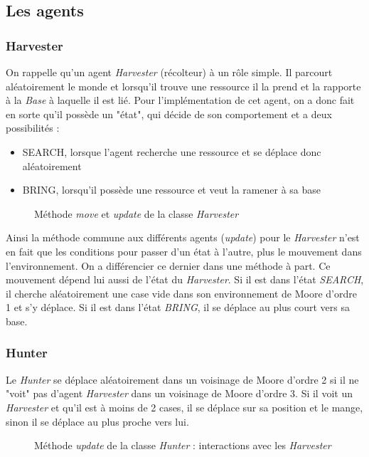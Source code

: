 \documentclass[a4paper, 12pt]{article}
\begin{document}
\subsection{Les agents}
\subsubsection{Harvester}
On rappelle qu'un agent \emph{Harvester} (récolteur) à un rôle simple. Il parcourt aléatoirement le monde et lorsqu'il trouve une ressource
il la prend et la rapporte à la \emph{Base} à laquelle il est lié. Pour l'implémentation de cet agent, on a donc fait
en sorte qu'il possède un "état", qui décide de son comportement et a deux possibilités :
\begin{itemize}
  \item SEARCH, lorsque l'agent recherche une ressource et se déplace donc aléatoirement
  \item BRING, lorsqu'il possède une ressource et veut la ramener à sa base
\end{itemize}
\begin{figure}[!h]
  \centering
  \caption{Méthode \emph{move} et \emph{update} de la classe \emph{Harvester}}
  
\end{figure}
\vspace{8pt}
Ainsi la méthode commune aux différents agents (\emph{update}) pour le \emph{Harvester} n'est en fait que les conditions
pour passer d'un état à l'autre, plus le mouvement dans l'environnement. On a différencier ce dernier dans une méthode à part.
Ce mouvement dépend lui aussi de l'état du \emph{Harvester}. Si il est dans l'état \emph{SEARCH}, il cherche aléatoirement une case vide
dans son environnement de Moore d'ordre 1 et s'y déplace. Si il est dans l'état \emph{BRING}, il se déplace au plus court vers sa base.

\subsubsection{Hunter}
Le \emph{Hunter} se déplace aléatoirement dans un voisinage de Moore d'ordre 2 si il ne "voit" pas d'agent \emph{Harvester} dans un
voisinage de Moore d'ordre 3. Si il voit un \emph{Harvester} et qu'il est à moins de 2 cases, il se déplace sur sa position et le
mange, sinon il se déplace au plus proche vers lui.
\begin{figure}[!h]
  \centering
  \caption{Méthode \emph{update}  de la classe \emph{Hunter} : interactions avec les \emph{Harvester}}
  
\end{figure}
\end{document}
